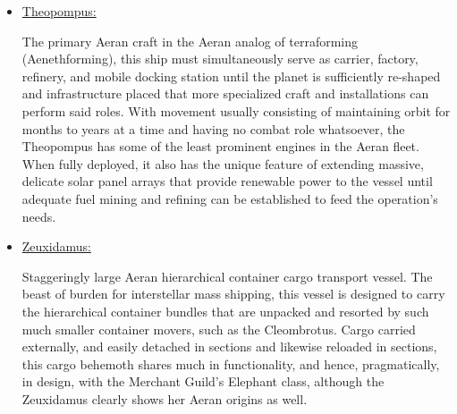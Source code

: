 \begin{itemize}
\item \href{http://vegastrike.sourceforge.net/wiki/Vessel:Theopompus}{Theopompus:}

The primary Aeran craft in the Aeran analog of terraforming
(Aenethforming), this ship must simultaneously serve as carrier,
factory, refinery, and mobile docking station until the planet is
sufficiently re-shaped and infrastructure placed that more specialized
craft and installations can perform said roles. With movement usually
consisting of maintaining orbit for months to years at a time and
having no combat role whatsoever, the Theopompus has some of the least
prominent engines in the Aeran fleet. When fully deployed, it also has
the unique feature of extending massive, delicate solar panel arrays
that provide renewable power to the vessel until adequate fuel mining
and refining can be established to feed the operation's needs.



\item \href{http://vegastrike.sourceforge.net/wiki/Vessel:Zeuxidamus}{Zeuxidamus:}

Staggeringly large Aeran hierarchical container cargo transport
vessel. The beast of burden for interstellar mass shipping, this
vessel is designed to carry the hierarchical container bundles that
are unpacked and resorted by such much smaller container movers, such
as the Cleombrotus. Cargo carried externally, and easily detached in
sections and likewise reloaded in sections, this cargo behemoth shares
much in functionality, and hence, pragmatically, in design, with the
Merchant Guild's Elephant class, although the Zeuxidamus clearly shows
her Aeran origins as well.

\end{itemize}

